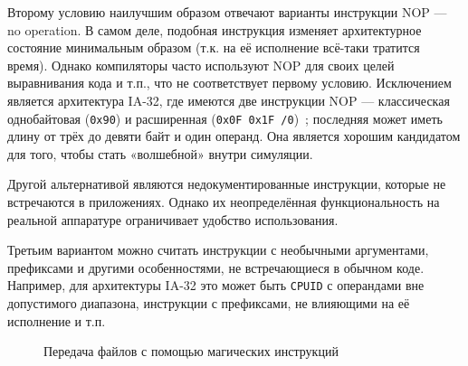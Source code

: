 Второму условию наилучшим образом отвечают варианты инструкции NOP --- no operation. В самом деле, подобная инструкция изменяет архитектурное состояние минимальным образом (т.к. на её исполнение всё-таки тратится время). Однако компиляторы часто используют NOP для своих целей выравнивания кода и т.п., что не соответствует первому условию. Исключением является архитектура IA-32, где имеются две инструкции NOP --- классическая однобайтовая (\texttt{0x90}) и  расширенная (\texttt{0x0F 0x1F /0})~\cite{intelmanual2a}; последняя может иметь длину от трёх до девяти байт и один операнд. Она является хорошим кандидатом для того, чтобы стать «волшебной» внутри симуляции.

Другой альтернативой являются недокументированные инструкции, которые не встречаются в приложениях. Однако их неопределённая функциональность на реальной аппаратуре ограничивает удобство использования.

Третьим вариантом можно считать инструкции с необычными аргументами, префиксами и другими особенностями, не встречающиеся в обычном коде. Например, для архитектуры IA-32 это может быть \texttt{CPUID} с операндами вне допустимого диапазона, инструкции с префиксами, не влияющими на её исполнение и т.п.

\begin{figure}[htp]
    \centering
    \caption{Передача файлов с помощью магических инструкций}
    \label{fig:magic-inst}
\end{figure}

